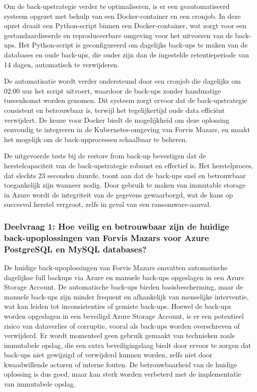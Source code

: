 Om de back-upstrategie verder te optimaliseren, is er een geautomatiseerd systeem opgezet met behulp van een Docker-container en een cronjob. In deze opzet draait een Python-script binnen een Docker-container, wat zorgt voor een gestandaardiseerde en reproduceerbare omgeving voor het uitvoeren van de back-ups. Het Python-script is geconfigureerd om dagelijks back-ups te maken van de databases en oude back-ups, die ouder zijn dan de ingestelde retentieperiode van 14 dagen, automatisch te verwijderen.

De automatisatie wordt verder ondersteund door een cronjob die dagelijks om 02:00 uur het script uitvoert, waardoor de back-ups zonder handmatige tussenkomst worden genomen. Dit systeem zorgt ervoor dat de back-upstrategie consistent en betrouwbaar is, terwijl het tegelijkertijd oude data efficiënt verwijdert. De keuze voor Docker biedt de mogelijkheid om deze oplossing eenvoudig te integreren in de Kubernetes-omgeving van Forvis Mazars, en maakt het mogelijk om de back-upprocessen schaalbaar te beheren.

De uitgevoerde tests bij de restore from back-up bevestigen dat de herstelcapaciteit van de back-upstrategie robuust en effectief is. Het herstelproces, dat slechts 23 seconden duurde, toont aan dat de back-ups snel en betrouwbaar toegankelijk zijn wanneer nodig. Door gebruik te maken van immutable storage in Azure wordt de integriteit van de gegevens gewaarborgd, wat de kans op succesvol herstel vergroot, zelfs in geval van een ransomware-aanval.

\subsubsection{Deelvraag 1: Hoe veilig en betrouwbaar zijn de huidige back-upoplossingen van Forvis Mazars voor Azure PostgreSQL en MySQL databases?}

De huidige back-upoplossingen van Forvis Mazars omvatten automatische dagelijkse full backups via Azure en manuele back-ups opgeslagen in een Azure Storage Account. De automatische back-ups bieden basisbescherming, maar de manuele back-ups zijn minder frequent en afhankelijk van menselijke interventie, wat kan leiden tot inconsistenties of gemiste back-ups. Hoewel de back-ups worden opgeslagen in een beveiligd Azure Storage Account, is er een potentieel risico van dataverlies of corruptie, vooral als back-ups worden overschreven of verwijderd. Er wordt momenteel geen gebruik gemaakt van technieken zoals immutabele opslag, die een extra beveiligingslaag biedt door ervoor te zorgen dat back-ups niet gewijzigd of verwijderd kunnen worden, zelfs niet door kwaadwillende actoren of interne fouten. De betrouwbaarheid van de huidige oplossing is dus goed, maar kan sterk worden verbeterd met de implementatie van immutabele opslag.

